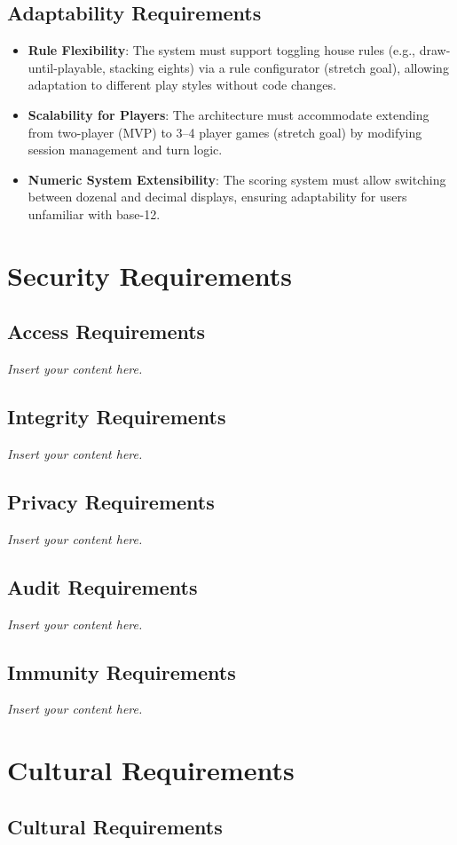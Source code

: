 \documentclass[12pt]{article}
\newcommand{\lips}{\textit{Insert your content here.}}
\begin{document}
\subsection{Adaptability Requirements}

\begin{itemize}
    \item \textbf{Rule Flexibility}: The system must support toggling house rules (e.g., draw-until-playable, stacking eights) via a rule configurator (stretch goal), allowing adaptation to different play styles without code changes.
    \item \textbf{Scalability for Players}: The architecture must accommodate extending from two-player (MVP) to 3--4 player games (stretch goal) by modifying session management and turn logic.
    \item \textbf{Numeric System Extensibility}: The scoring system must allow switching between dozenal and decimal displays, ensuring adaptability for users unfamiliar with base-12.
\end{itemize}

\section{Security Requirements}
\subsection{Access Requirements}
\lips
\subsection{Integrity Requirements}
\lips
\subsection{Privacy Requirements}
\lips
\subsection{Audit Requirements}
\lips
\subsection{Immunity Requirements}
\lips

\section{Cultural Requirements}
\subsection{Cultural Requirements}
\end{document}
